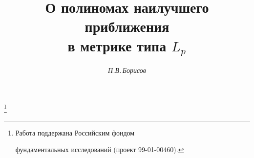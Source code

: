 

 


%


\newcommand{\sign}{\operatorname{sign}} 


\newcommand{\conv}{\operatorname{conv}} 


\newcommand{\tts}[1]{} 


 




 


\setcounter{page}{3} 












 


\author{\it П.В.\,Борисов} 




\title{О полиномах наилучшего приближения\\ в метрике типа $L_p$} 


\thanks{Работа поддержана Российским фондом 


фундаментальных исследований (проект 99-01-00460).} 


 


\date{} 




\pagestyle{plain} %


 




